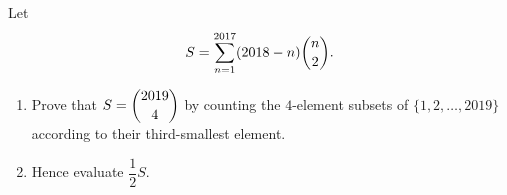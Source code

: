 Let
\[S=\sum_{n=1}^{2017}(2018-n)\dbinom{n}{2}.\]
\begin{enumerate}
\item[(a)] Prove that $S=\dbinom{2019}{4}$ by counting the $4$-element subsets of $\{1,2,\dots,2019\}$ according to their third-smallest element.
\item[(b)] Hence evaluate $\dfrac12S$.
\end{enumerate}
